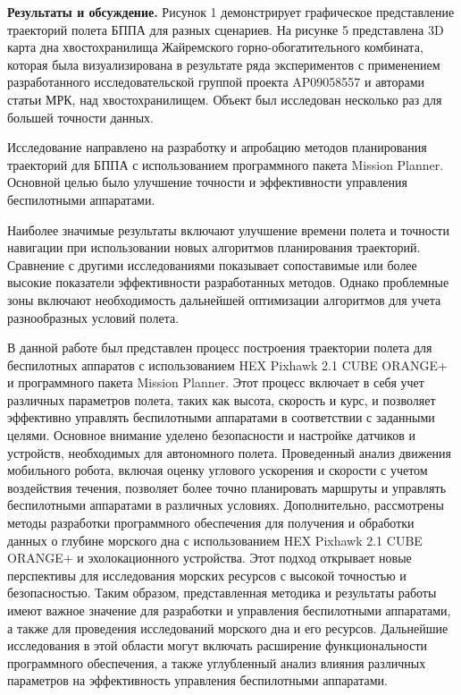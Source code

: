{\bfseries Результаты и обсуждение.} Рисунок 1 демонстрирует графическое
представление траекторий полета БППА для разных сценариев. На рисунке 5
представлена 3D карта дна хвостохранилища Жайремского
горно-обогатительного комбината, которая была визуализирована в
результате ряда экспериментов с применением разработанного
исследовательской группой проекта AP09058557 и авторами статьи МРК, над
хвостохранилищем. Объект был исследован несколько раз для большей
точности данных.

Исследование направлено на разработку и апробацию методов планирования
траекторий для БППА с использованием программного пакета Mission
Planner. Основной целью было улучшение точности и эффективности
управления беспилотными аппаратами.

Наиболее значимые результаты включают улучшение времени полета и
точности навигации при использовании новых алгоритмов планирования
траекторий. Сравнение с другими исследованиями показывает сопоставимые
или более высокие показатели эффективности разработанных методов. Однако
проблемные зоны включают необходимость дальнейшей оптимизации алгоритмов
для учета разнообразных условий полета.

В данной работе был представлен процесс построения траектории полета для
беспилотных аппаратов с использованием HEX Pixhawk 2.1 CUBE ORANGE+ и
программного пакета Mission Planner. Этот процесс включает в себя учет
различных параметров полета, таких как высота, скорость и курс, и
позволяет эффективно управлять беспилотными аппаратами в соответствии с
заданными целями. Основное внимание уделено безопасности и настройке
датчиков и устройств, необходимых для автономного полета. Проведенный
анализ движения мобильного робота, включая оценку углового ускорения и
скорости с учетом воздействия течения, позволяет более точно планировать
маршруты и управлять беспилотными аппаратами в различных условиях.
Дополнительно, рассмотрены методы разработки программного обеспечения
для получения и обработки данных о глубине морского дна с использованием
HEX Pixhawk 2.1 CUBE ORANGE+ и эхолокационного устройства. Этот подход
открывает новые перспективы для исследования морских ресурсов с высокой
точностью и безопасностью. Таким образом, представленная методика и
результаты работы имеют важное значение для разработки и управления
беспилотными аппаратами, а также для проведения исследований морского
дна и его ресурсов. Дальнейшие исследования в этой области могут
включать расширение функциональности программного обеспечения, а также
углубленный анализ влияния различных параметров на эффективность
управления беспилотными аппаратами.

